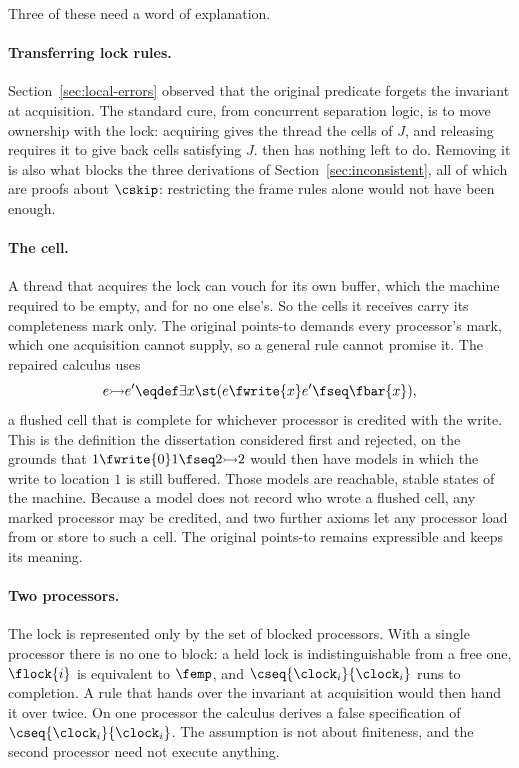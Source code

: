 Three of these need a word of explanation.

\paragraph{Transferring lock rules.}
Section~\ref{sec:local-errors} observed that the original predicate forgets
the invariant at acquisition. The standard cure, from concurrent separation
logic, is to move ownership with the lock: acquiring gives the thread the
cells of $J$, and releasing requires it to give back cells satisfying $J$.
 then has nothing left to do. Removing it is also what blocks the
three derivations of Section~\ref{sec:inconsistent}, all of which are
proofs about $\cskip$: restricting the frame rules alone would not have
been enough.

\paragraph{The cell.}
A thread that acquires the lock can vouch for its own buffer, which the
machine required to be empty, and for no one else's. So the cells it
receives carry its completeness mark only. The
original points-to demands every processor's mark, which one acquisition
cannot supply, so a general  rule cannot promise it. The repaired calculus uses
\[
  e \fcell e' \eqdef \exists x \st (e \fwrite{x} e' \fseq \fbar{x}),
\]
a flushed cell that is complete for whichever processor is credited with
the write. This is the definition the dissertation considered first and
rejected, on the grounds that $1 \fwrite{0} 1 \fseq 2 \fcell 2$ would then
have models in which the write to location $1$ is still buffered. Those
models are reachable, stable states of the machine. Because a model does
not record who wrote a flushed cell, any marked processor may be credited,
and two further axioms let any processor load from or store to such a
cell. The original points-to remains expressible and keeps its meaning.

\paragraph{Two processors.}
The lock is represented only by the set of blocked processors. With a
single processor there is no one to block: a held lock is indistinguishable
from a free one, $\flock{i}$ is equivalent to $\femp$, and
$\cseq{\clock_i}{\clock_i}$ runs to completion. A rule that hands over the
invariant at acquisition would then hand it over twice. On one processor the calculus derives a false
specification of $\cseq{\clock_i}{\clock_i}$. The assumption is
not about finiteness, and the second processor need not execute anything.


